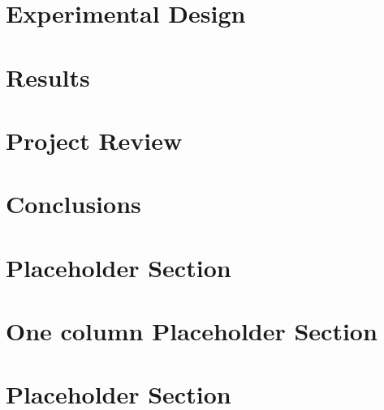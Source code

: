 \documentclass{article}
\begin{document}
\section{Experimental Design}


\section{Results}


\section{Project Review}


\section{Conclusions}






\section{Placeholder Section}


\onecolumn
\section{One column Placeholder Section}

\twocolumn

\section{Placeholder Section}

\end{document}
